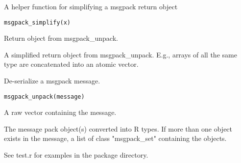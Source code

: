 \documentclass[letterpaper]{book}
\begin{document}
%
\begin{Description}\relax
A helper function for simplifying a msgpack return object
\end{Description}
%
\begin{Usage}
\begin{verbatim}
msgpack_simplify(x)
\end{verbatim}
\end{Usage}
%
\begin{Arguments}
\begin{ldescription}
\item[\code{x}] Return object from msgpack\_unpack.
\end{ldescription}
\end{Arguments}
%
\begin{Value}
A simplified return object from msgpack\_unpack.  E.g., arrays of all the same type are concatenated into an atomic vector.
\end{Value}
%
\begin{Description}\relax
De-serialize a msgpack message.
\end{Description}
%
\begin{Usage}
\begin{verbatim}
msgpack_unpack(message)
\end{verbatim}
\end{Usage}
%
\begin{Arguments}
\begin{ldescription}
\item[\code{message}] A raw vector containing the message.
\end{ldescription}
\end{Arguments}
%
\begin{Value}
The message pack object(s) converted into R types.  If more than one object exists in the message, a list of class "msgpack\_set" containing the objects.
\end{Value}
%
\begin{SeeAlso}\relax
See test.r for examples in the package directory.
\end{SeeAlso}
\printindex{}
\end{document}
